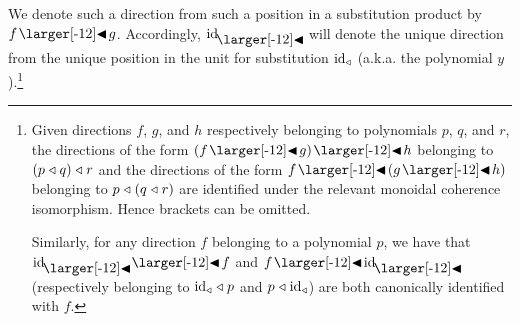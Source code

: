 \documentclass{amsart}
\begin{document}
We denote such a direction from such a position in a substitution
product by $f \subd g$. Accordingly, $\idsubd$ will denote the unique
direction from the unique position in the unit for substitution
$\mathrm{id}_{\mathrel{\triangleleft}}$ (a.k.a. the polynomial $y$).\footnote{Given directions $f$,
  $g$, and $h$ respectively belonging to polynomials $p$, $q$, and
  $r$, the directions of the form $(f \subd g)\subd h$ belonging to
  $(p \mathrel{\triangleleft} q) \mathrel{\triangleleft} r$ and the directions of the form
  $f \subd (g \subd h)$ belonging to $p \mathrel{\triangleleft} (q \mathrel{\triangleleft} r)$ are
  identified under the relevant monoidal coherence isomorphism. Hence
  brackets can be omitted.

  Similarly, for any direction $f$ belonging to a polynomial $p$, we
  have that $\idsubd \subd f$ and $f \subd \idsubd$ (respectively
  belonging to $\mathrm{id}_{\mathrel{\triangleleft}} \mathrel{\triangleleft} p$ and $p \mathrel{\triangleleft} \mathrm{id}_{\mathrel{\triangleleft}}$) are both
  canonically identified with $f$.}
\end{document}
